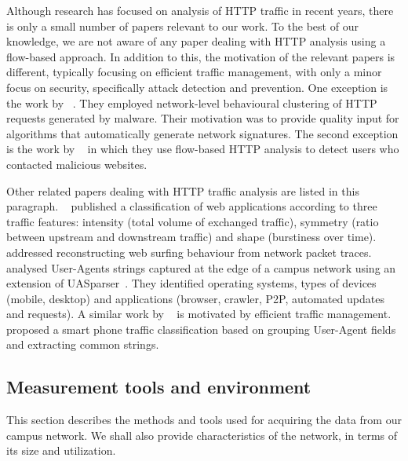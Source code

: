 Although research has focused on analysis of HTTP traffic in recent years, there is only a small number of papers relevant to our work. To the best of our knowledge, we are not aware of any paper dealing with HTTP analysis using a flow-based approach. In addition to this, the motivation of the relevant papers is different, typically focusing on efficient traffic management, with only a minor focus on security, specifically attack detection and prevention. One exception is the work by \citeauthor{Perdisci-2010-Behavioral}~\cite{Perdisci-2010-Behavioral}. They employed network-level behavioural clustering of HTTP requests generated by malware. Their motivation was to provide quality input for algorithms that automatically generate network signatures. The second exception is the work by \citeauthor{Husak-2014-PhiGARo}~\cite{Husak-2014-PhiGARo} in which they use flow-based HTTP analysis to detect users who contacted malicious websites.

Other related papers dealing with HTTP traffic analysis are listed in this paragraph. \citeauthor{Augustin-2011-Traffic}~\cite{Augustin-2011-Traffic} published a classification of web applications according to three traffic features: intensity (total volume of exchanged traffic), symmetry (ratio between upstream and downstream traffic) and shape (burstiness over time). \citeauthor{Xie-2013-ReSurf}~\cite{Xie-2013-ReSurf} addressed reconstructing web surfing behaviour from network packet traces. \citeauthor{Xu-2014-Toward}~\cite{Xu-2014-Toward} analysed User-Agents strings captured at the edge of a campus network using an extension of UASparser~\cite{Mallat-2017-UASparser}. They identified operating systems, types of devices (mobile, desktop) and applications (browser, crawler, P2P, automated updates and requests). A similar work by \citeauthor{Jin-2012-Integrated}~\cite{Jin-2012-Integrated} is motivated by efficient traffic management. \citeauthor{Hur-2012-Towards}~\cite{Hur-2012-Towards} proposed a smart phone traffic classification based on grouping User-Agent fields and extracting common strings.

\subsection{Measurement tools and environment}\label{subsec:httpsecurity-measurement}

This section describes the methods and tools used for acquiring the data from our campus network. We shall also provide characteristics of the network, in terms of its size and utilization.

